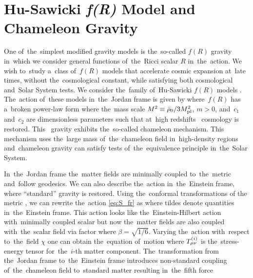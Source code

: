 \section[Chameleon Gravity]{Hu-Sawicki \texorpdfstring{\textit{\lowercase{f}(R)}}{fR} Model and Chameleon Gravity}
\label{sec_cham}
One of~the~simplest modified gravity models is the~so-called $f(R)$ gravity in~which we consider general functions of~the~Ricci scalar $R$ in~the~action. We wish to~study a~class of~$f(R)$ models that accelerate cosmic expansion at~late times, without the~cosmological constant, while satisfying both cosmological and~Solar System tests. We consider the~family of~Hu-Sawicki $f(R)$ models \parencite{Hu-Saw}. The~action of~these models in~the~Jordan frame is given by 
where~$f(R)$ has a~broken power-law form
where the~mass scale $M^2\equiv\bar\rho_0/3M_{\text{\scriptsize pl}}^2$, $m>0$, and~$c_1$ and~$c_2$ are dimensionless parameters such that at~high redshifts \LCDM\ cosmology is restored. This \fR\ gravity exhibits the~so-called chameleon mechanism. This mechanism uses the~large mass of~the~chameleon field in~high-density regions and~chameleon gravity can satisfy tests of~the~equivalence principle in~the~Solar System.

In~the~Jordan frame the~matter fields are minimally coupled to~the~metric and~follow geodesics. We can also describe the~action in~the~Einstein frame, where ``standard'' gravity is restored. Using the~conformal transformations of the metric \parencite{Faraoni:1998qx}, we can rewrite the~action \eqref{eq:S_fr} as
where tildes denote quantities in~the~Einstein frame. This action looks like the~Einstein-Hilbert action with~minimally coupled scalar but now the~matter fields are also coupled with~the~scalar field via factor
where $\beta=\sqrt{1/6}$. Varying the~action with~respect to~the~field $\chi$ one can obtain the~equation of~motion
where $T^{(i)}_{\mu\nu}$ is the~stress-energy tensor for~the~$i$-th matter component. The~transformation from the~Jordan frame to~the~Einstein frame introduces non-standard coupling of~the~chameleon field to~standard matter resulting in~the~fifth force


